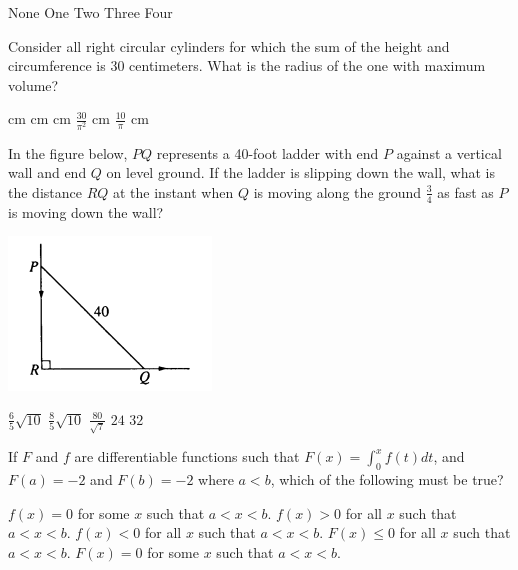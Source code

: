 \begin{questions}
    \begin{oneparchoices}
    \choice None
    \CorrectChoice One
    \choice Two
    \choice Three
    \choice Four
    \end{oneparchoices}

\question[2] Consider all right circular cylinders for which the sum
    of the height and circumference is 30 centimeters. What is the
    radius of the one with maximum volume?

    \begin{oneparchoices}
     cm
     cm
     cm 
    \choice $\frac{30}{\pi^2}$ cm
    \CorrectChoice $\frac{10}{\pi}$ cm
    \end{oneparchoices}

\question[2] In the figure below, $PQ$ represents a 40-foot ladder
    with end $P$ against a vertical wall and end $Q$ on level
    ground. If the ladder is slipping down the wall, what is the
    distance $RQ$ at the instant when $Q$ is moving along the ground
    $\frac{3}{4}$ as fast as $P$ is moving down the wall?

    \begin{center}
        \includegraphics{BC34.png}
    \end{center}

    \begin{oneparchoices}
    \choice $\frac{6}{5}\sqrt{10}$
    \choice $\frac{8}{5}\sqrt{10}$
    \choice $\frac{80}{\sqrt{7}}$
    \choice $24$
    \CorrectChoice $32$
    \end{oneparchoices}

\question[2] If $F$ and $f$ are differentiable functions such that
    $F(x) = \int_0^x f(t)dt$, and $F(a) = -2$ and $F(b) = -2$ where $a
    < b$, which of the following must be true?

    \begin{oneparchoices}
    \CorrectChoice $f(x) = 0$ for some $x$ such that $a < x < b$.
    \choice $f(x) > 0$ for all $x$ such that $a < x < b$.
    \choice $f(x) < 0$ for all $x$ such that $a < x < b$.
    \choice $F(x) \le 0$ for all $x$ such that $a < x < b$.
    \choice $F(x) = 0$ for some $x$ such that $a < x < b$.
    \end{oneparchoices}


\end{questions}
